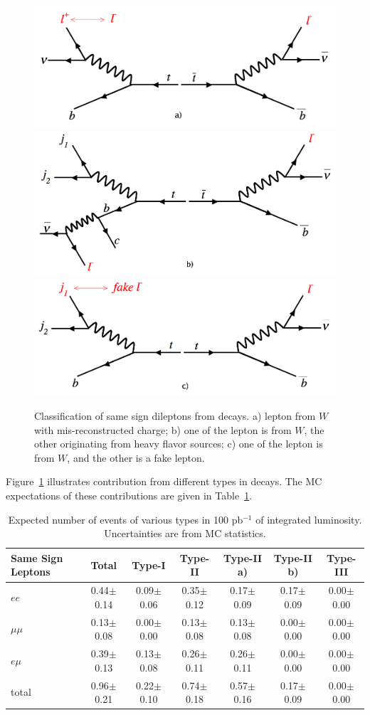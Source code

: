\begin{figure}[htb]
\begin{center}
\includegraphics[width=0.32\linewidth, height=0.2\linewidth]{figs/feyntypeI.png}
\includegraphics[width=0.32\linewidth, height=0.2\linewidth]{figs/feyntypeIIa.png}
\includegraphics[width=0.32\linewidth, height=0.2\linewidth]{figs/feyntypeIIb.png}
\caption{ Classification of same sign dileptons from \ttbar decays. a) lepton from $W$ with mis-reconstructed charge; 
b) one of the lepton is from $W$, the other originating from heavy flavor sources; c) one of the lepton is from $W$,
and the other is a fake lepton. \label{fig:fakeOrigin}}
\end{center}
\end{figure}

Figure~\ref{fig:fakeOrigin} illustrates contribution from different types in \ttbar decays. The MC 
expectations of these contributions are given in Table~\ref{tab:fakeOrigin}.

\begin{table}[hbt]
\begin{center}
\begin{tabular}{|l|c|c|c|c|c|c|}\hline
Same Sign Leptons & Total & 	 Type-I &  Type-II & Type-II a) & Type-II b) & Type-III \\ \hline

$ee$ & 0.44$\pm$0.14 & 0.09$\pm$0.06 & 0.35$\pm$0.12 & 0.17$\pm$0.09 & 0.17$\pm$0.09 & 0.00$\pm$0.00 \\
$\mu\mu$ & 0.13$\pm$0.08 & 0.00$\pm$0.00 & 0.13$\pm$0.08 & 0.13$\pm$0.08 & 0.00$\pm$0.00 & 0.00$\pm$0.00 \\
$e\mu$ & 0.39$\pm$0.13 & 0.13$\pm$0.08 & 0.26$\pm$0.11 & 0.26$\pm$0.11 & 0.00$\pm$0.00 & 0.00$\pm$0.00 \\
total & 0.96$\pm$0.21 & 0.22$\pm$0.10 & 0.74$\pm$0.18 &	0.57$\pm$0.16 &	0.17$\pm$0.09 &	0.00$\pm$0.00 \\ \hline

\end{tabular}
\caption{ Expected number of \ttbar events of various types in 100 pb$^{-1}$ of integrated luminosity. Uncertainties are from MC statistics.\label{tab:fakeOrigin}}
\end{center}
\end{table}

